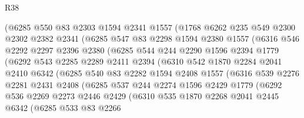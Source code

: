\begin{lexlean}{R38}
\begin{coremodule}
            (@6285
              @550
              @83
              @2303
              @1594
              @2341
              @1557
              (@1768
                @6262
                @235
                @549
                @2300
                @2302
                @2382
                @2341
                (@6285
                  @547
                  @83
                  @2298
                  @1594
                  @2380
                  @1557
                  (@6316
                    @546
                    @2292
                    @2297
                    @2396
                    @2380
                    (@6285
                      @544
                      @244
                      @2290
                      @1596
                      @2394
                      @1779
                      (@6292
                        @543
                        @2285
                        @2289
                        @2411
                        @2394
                        (@6310
                          @542
                          @1870
                          @2284
                          @2041
                          @2410
                          @6342
                          (@6285
                            @540
                            @83
                            @2282
                            @1594
                            @2408
                            @1557
                            (@6316
                              @539
                              @2276
                              @2281
                              @2431
                              @2408
                              (@6285
                                @537
                                @244
                                @2274
                                @1596
                                @2429
                                @1779
                                (@6292
                                  @536
                                  @2269
                                  @2273
                                  @2446
                                  @2429
                                  (@6310
                                    @535
                                    @1870
                                    @2268
                                    @2041
                                    @2445
                                    @6342
                                    (@6285
                                      @533
                                      @83
                                      @2266

\end{coremodule}
\end{lexlean}
